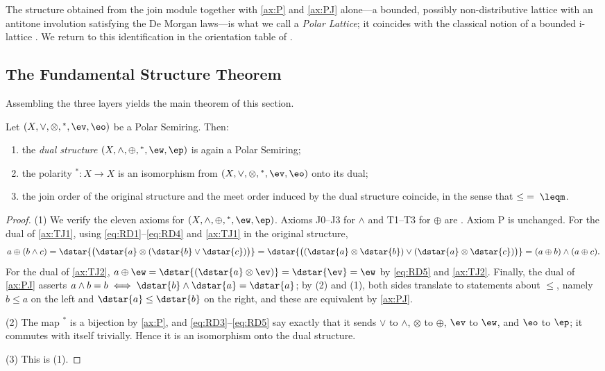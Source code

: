 The structure obtained from the join module together with \eqref{ax:P} and
\eqref{ax:PJ} alone---a bounded, possibly non-distributive lattice with an
antitone involution satisfying the De Morgan laws---is what we call a
\emph{Polar Lattice}; it coincides with the classical notion of a bounded
i-lattice \citep{Kalman1958}. We return to this identification in the
orientation table of .

\subsection{The Fundamental Structure Theorem}\label{subsec:fundamental}

Assembling the three layers yields the main theorem of this section.

\begin{theorem}\label{thm:fundamental}
Let $(X,\vee,\otimes,{}^{*},\ev,\eo)$ be a Polar Semiring. Then:
\begin{enumerate}
  \item the \emph{dual structure} $(X,\wedge,\oplus,{}^{*},\ew,\ep)$ is
  again a Polar Semiring;
  \item the polarity ${}^{*}\colon X \to X$ is an isomorphism from
  $(X,\vee,\otimes,{}^{*},\ev,\eo)$ onto its dual;
  \item the join order of the original structure and the meet order induced
  by the dual structure coincide, in the sense that
  $\leq \;=\; \leqm$.
\end{enumerate}
\end{theorem}

\begin{proof}
(1) We verify the eleven axioms for
$(X,\wedge,\oplus,{}^{*},\ew,\ep)$. Axioms J0--J3 for $\wedge$ and T1--T3
for $\oplus$ are . Axiom P is unchanged. For
the dual of \eqref{ax:TJ1}, using \eqref{eq:RD1}--\eqref{eq:RD4} and
\eqref{ax:TJ1} in the original structure,
\[
  a \oplus (b \wedge c)
  = \dstar{\bigl(\dstar{a} \otimes (\dstar{b} \vee \dstar{c})\bigr)}
  = \dstar{\bigl((\dstar{a} \otimes \dstar{b}) \vee
                 (\dstar{a} \otimes \dstar{c})\bigr)}
  = (a \oplus b) \wedge (a \oplus c).
\]
For the dual of \eqref{ax:TJ2},
$a \oplus \ew
 = \dstar{(\dstar{a} \otimes \ev)}
 = \dstar{\ev} = \ew$
by \eqref{eq:RD5} and \eqref{ax:TJ2}. Finally, the dual of \eqref{ax:PJ}
asserts $a \wedge b = b \iff \dstar{b} \wedge \dstar{a} = \dstar{a}$; by
(2) and (1), both sides
translate to statements about $\leq$, namely $b \leq a$ on the left and
$\dstar{a} \leq \dstar{b}$ on the right, and these are equivalent by
\eqref{ax:PJ}.

(2) The map ${}^{*}$ is a bijection by \eqref{ax:P}, and
\eqref{eq:RD3}--\eqref{eq:RD5} say exactly that it sends $\vee$ to
$\wedge$, $\otimes$ to $\oplus$, $\ev$ to $\ew$, and $\eo$ to $\ep$; it
commutes with itself trivially. Hence it is an isomorphism onto the dual
structure.

(3) This is (1).
\end{proof}

